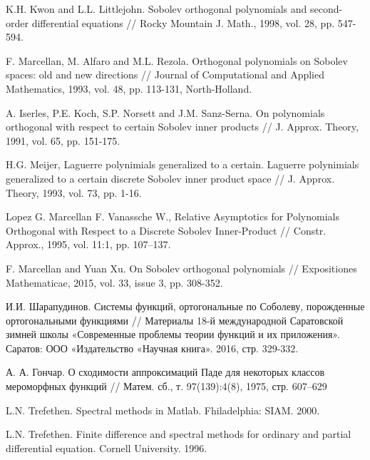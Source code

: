 \begin{thebibliography}{1}
 K.H. Kwon and L.L. Littlejohn. Sobolev orthogonal polynomials and second-order differential equations // Rocky Mountain J. Math., 1998, vol. 28, pp. 547-594.

 F. Marcellan, M. Alfaro and M.L. Rezola. Orthogonal polynomials on Sobolev spaces: old and new directions // Journal of Computational and Applied Mathematics, 1993, vol. 48, pp. 113-131, North-Holland.

 A. Iserles, P.E. Koch, S.P. Norsett and J.M. Sanz-Serna. On polynomials  orthogonal  with respect  to certain Sobolev inner products // J. Approx. Theory, 1991, vol. 65, pp. 151-175.

 H.G. Meijer, Laguerre polynimials generalized to a certain.  Laguerre polynimials generalized to a certain discrete Sobolev inner product space // J. Approx. Theory, 1993, vol. 73, pp. 1-16.

 Lopez G. Marcellan F. Vanassche W., Relative Asymptotics for Polynomials Orthogonal with Respect to a Discrete Sobolev Inner-Product // Constr. Approx., 1995, vol. 11:1, pp. 107–137.



 F. Marcellan and Yuan Xu. On Sobolev orthogonal polynomials // Expositiones Mathematicae, 2015, vol. 33, issue 3, pp. 308-352.

 И.И. Шарапудинов. Системы функций, ортогональные по Соболеву, порожденные ортогональными функциями // Материалы 18-й международной Саратовской зимней школы «Современные проблемы теории функций и их приложения». Саратов: ООО «Издательство «Научная книга». 2016, стр. 329-332.

 А. А. Гончар. О сходимости аппроксимаций Паде для некоторых классов мероморфных функций // Матем. сб., т. 97(139):4(8), 1975, стр. 607–629


 L.N. Trefethen. Spectral methods in Matlab. Fhiladelphia: SIAM. 2000.

 L.N. Trefethen. Finite difference and spectral methods for ordinary and partial differential equation. Cornell University. 1996.



\end{thebibliography}
